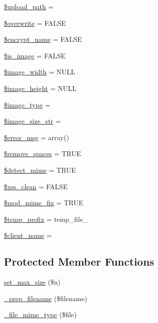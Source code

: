 \begin{DoxyCompactItemize}
\item 
\mbox{\hyperlink{class_c_i___upload_a38507bf82f955d4b13642a3c7fd6e773}{\$upload\+\_\+path}} = \textquotesingle{}\textquotesingle{}
\item 
\mbox{\hyperlink{class_c_i___upload_a8d31b0ad9cccde7e2d857097672ed6cf}{\$overwrite}} = F\+A\+L\+SE
\item 
\mbox{\hyperlink{class_c_i___upload_a54a751add0762edd4da11373e3b56687}{\$encrypt\+\_\+name}} = F\+A\+L\+SE
\item 
\mbox{\hyperlink{class_c_i___upload_a4dae8ae20ed5fdf406554e1911065753}{\$is\+\_\+image}} = F\+A\+L\+SE
\item 
\mbox{\hyperlink{class_c_i___upload_a8dadc2d2dcc0f25529a2d1e080d08169}{\$image\+\_\+width}} = N\+U\+LL
\item 
\mbox{\hyperlink{class_c_i___upload_af1b0485025a4c66fa3b2fc442df02d72}{\$image\+\_\+height}} = N\+U\+LL
\item 
\mbox{\hyperlink{class_c_i___upload_a939d6733d998cce893403d2f59f40317}{\$image\+\_\+type}} = \textquotesingle{}\textquotesingle{}
\item 
\mbox{\hyperlink{class_c_i___upload_a3a1769072af8ab3b0c5d6e0c1a1ae2ef}{\$image\+\_\+size\+\_\+str}} = \textquotesingle{}\textquotesingle{}
\item 
\mbox{\hyperlink{class_c_i___upload_acf910733622c1fa671b9f755c69c2ec7}{\$error\+\_\+msg}} = array()
\item 
\mbox{\hyperlink{class_c_i___upload_ad9f32a52b4b2c16e42a007e0fa832721}{\$remove\+\_\+spaces}} = T\+R\+UE
\item 
\mbox{\hyperlink{class_c_i___upload_a50f6c723a0c96d773ecff982e7117a5f}{\$detect\+\_\+mime}} = T\+R\+UE
\item 
\mbox{\hyperlink{class_c_i___upload_a0f2ee8861c0b3164a5c6e126dd98c0cc}{\$xss\+\_\+clean}} = F\+A\+L\+SE
\item 
\mbox{\hyperlink{class_c_i___upload_a5f54983a6ad24a5ee5c4ff5d9de48d83}{\$mod\+\_\+mime\+\_\+fix}} = T\+R\+UE
\item 
\mbox{\hyperlink{class_c_i___upload_ab38888cba65ae75bbc5b3841bc69d64a}{\$temp\+\_\+prefix}} = \textquotesingle{}temp\+\_\+file\+\_\+\textquotesingle{}
\item 
\mbox{\hyperlink{class_c_i___upload_a3b81ba4d3535269e20e0b4a2ddab2edc}{\$client\+\_\+name}} = \textquotesingle{}\textquotesingle{}
\end{DoxyCompactItemize}
\subsection*{Protected Member Functions}
\begin{DoxyCompactItemize}
\item 
\mbox{\hyperlink{class_c_i___upload_ac6e7445ece6780c730e910d978dde95e}{set\+\_\+max\+\_\+size}} (\$n)
\item 
\mbox{\hyperlink{class_c_i___upload_a00936ce870d818794909bf16dc2ff70b}{\+\_\+prep\+\_\+filename}} (\$filename)
\item 
\mbox{\hyperlink{class_c_i___upload_a8ac4511eca70b271965b7f8ef00faf66}{\+\_\+file\+\_\+mime\+\_\+type}} (\$file)
\end{DoxyCompactItemize}
